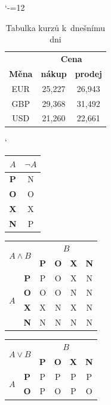 \documentclass[a4paper,11pt]{article}
\begin{document}
\begin{table}[h]
\centering
\catcode`-=12
\begin{tabular}{|c|c|c|}
\hline
		      & \multicolumn{2}{c|}{\textbf{Cena}} \\ 
\cline{2-3}
\textbf{Měna} & \textbf{nákup}	& \textbf{prodej} \\ 
\hline
EUR			  & 25,227 			& 26,943 \\
GBP			  & 29,368			& 31,492 \\
USD		      & 21,260 			& 22,661 \\ 
\hline
\end{tabular}
\caption{Tabulka kurzů k~dnešnímu dni}
\label{tabulka1}
\end{table}

\begin{table}[h]
\catcode`
\centering
\begin{tabular}[p]{|c|c|}
\hline
$A$	       & ${\neg}A$ \\ 
\hline
\textbf{P} & N \\ 
\hline
\textbf{O} & O \\ 
\hline
\textbf{X} & X \\ 
\hline
\textbf{N} & P \\ 
\hline
\end{tabular}
\begin{tabular}[p]{|c|c|c|c|c|c|}
\hline
\multicolumn{2}{|c|}{\multirow{2}{*}{$A \wedge B$}} & \multicolumn{4}{c|}{$B$}
\\ \cline{3-6}
\multicolumn{2}{|c|}{} & \textbf{P} & \textbf{O} & \textbf{X} & \textbf{N} \\ 
\hline
\multirow{4}{*}{$A$}   & \textbf{P} & P & O & X & N \\ 
\cline{2-6}
					   & \textbf{O} & O & O & N & N \\ 
\cline{2-6}
					   & \textbf{X} & X & N & X & N \\ 
\cline{2-6}
					   & \textbf{N} & N & N & N & N \\ 
\hline
\end{tabular}
\begin{tabular}[p]{|c|c|c|c|c|c|}
\hline
\multicolumn{2}{|c|}{\multirow{2}{*}{$ A \vee B $}} & \multicolumn{4}{c|}{$ B $}\\ \cline{3-6}
\multicolumn{2}{|c|}{} & \textbf{P} & \textbf{O} & \textbf{X} & \textbf{N} \\
\hline
\multirow{4}{*}{$ A $} & \textbf{P} & P & P & P & P \\ 
\cline{2-6}
                       & \textbf{O} & P & O & P & O \\ 

\end{tabular}
\end{table}
\end{document}
